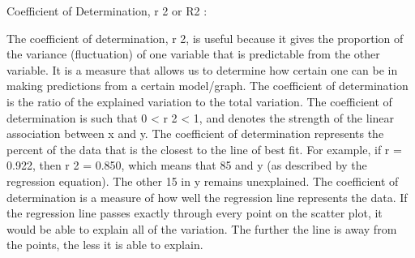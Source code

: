  

Coefficient of Determination, r 2  or  R2 : 

   The coefficient of determination, r 2, is useful because it gives the proportion of 
      the variance (fluctuation) of one variable that is predictable from the other variable.
      It is a measure that allows us to determine how certain one can be in making
      predictions from a certain model/graph.
   The coefficient of determination is the ratio of the explained variation to the total
      variation.
   The coefficient of determination is such that 0 <  r 2 < 1,  and denotes the strength
      of the linear association between x and y.  
   The coefficient of determination represents the percent of the data that is the closest
      to the line of best fit.  For example, if r = 0.922, then r 2 = 0.850, which means that
      85%
      and y (as described by the regression equation).  The other 15%
      in y remains unexplained.
   The coefficient of determination is a measure of how well the regression line
      represents the data.  If the regression line passes exactly through every point on the
      scatter plot, it would be able to explain all of the variation. The further the line is
      away from the points, the less it is able to explain. 
 
